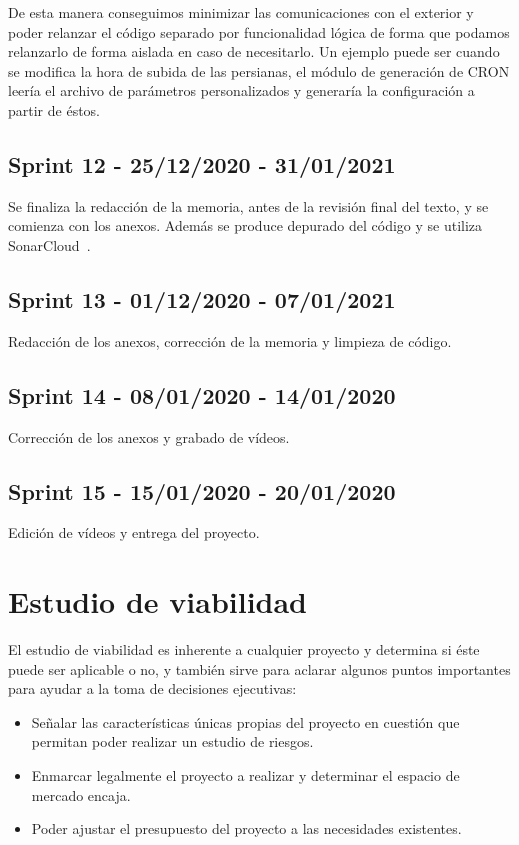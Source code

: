 De esta manera conseguimos minimizar las comunicaciones con el exterior y poder relanzar el código separado por funcionalidad lógica de forma que podamos relanzarlo de forma aislada en caso de necesitarlo. Un ejemplo puede ser cuando se modifica la hora de subida de las persianas, el módulo de generación de CRON leería el archivo de parámetros personalizados y generaría la configuración a partir de éstos.




\subsection{Sprint 12 - 25/12/2020 - 31/01/2021}
Se finaliza la redacción de la memoria, antes de la revisión final del texto, y se comienza con los anexos. Además se produce depurado del código y se utiliza SonarCloud~\cite{misc:sonarcloud}.

\subsection{Sprint 13 - 01/12/2020 - 07/01/2021}
Redacción de los anexos, corrección de la memoria y limpieza de código.

\subsection{Sprint 14 - 08/01/2020 - 14/01/2020}
Corrección de los anexos y grabado de vídeos.

\subsection{Sprint 15 - 15/01/2020 - 20/01/2020}
Edición de vídeos y entrega del proyecto.




\section{Estudio de viabilidad}
El estudio de viabilidad es inherente a cualquier proyecto y determina si éste puede ser aplicable o no, y también sirve para aclarar algunos puntos importantes para ayudar a la toma de decisiones ejecutivas:
\begin{itemize}
    \item Señalar las características únicas propias del proyecto en cuestión que permitan poder realizar un estudio de riesgos.
    \item Enmarcar legalmente el proyecto a realizar y determinar el espacio de mercado encaja.
    \item Poder ajustar el presupuesto del proyecto a las necesidades existentes.
\end{itemize}

